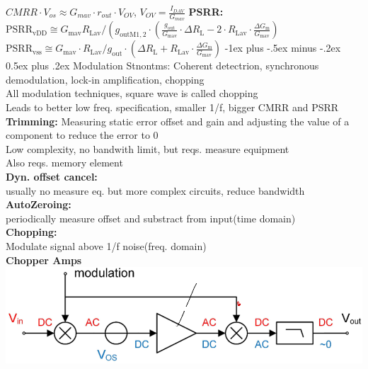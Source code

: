 \documentclass[5pt,landscape]{article}
\makeatletter
\renewcommand{\section}{\@startsection{section}{1}{0mm}%
                                {-1ex plus -.5ex minus -.2ex}%
                                {0.5ex plus .2ex}%
                                {\normalfont\large\bfseries}}
\makeatother
\begin{document}
\begin{multicols*}{5}
$ CMRR \cdot V_{os} \approx G_{mav} \cdot r_{out} \cdot V_{OV} $, $ V_{OV} = \frac{I_{DAV}}{G_{mav}} $
\textbf{PSRR:}\\
$ \mathrm{PSRR}_{\mathrm{vDD}} \cong G_{\operatorname{mav}} R_{\mathrm{Lav}} /\left(g_{\mathrm{outM} 1,2} \cdot\left(\frac{g_{\mathrm{out}}}{G_{\mathrm{mav}}} \cdot \Delta R_{\mathrm{L}}-2 \cdot R_{\mathrm{Lav}} \cdot \frac{\Delta G_{\mathrm{m}}}{G_{\mathrm{mav}}}\right)\right. $\\
$ \mathrm{PSRR}_{\mathrm{vss}} \cong G_{\operatorname{mav}} \cdot R_{\mathrm{Lav}} / g_{\mathrm{out}} \cdot\left(\Delta R_{\mathrm{L}}+R_{\mathrm{Lav}} \cdot \frac{\Delta G_{\mathrm{m}}}{G_{\mathrm{mav}}}\right) $
\section{Modulation}
Stnontms: Coherent detectrion, synchronous demodulation, lock-in amplification, chopping\\
All modulation techniques, square wave is called chopping\\
Leads to better low freq. specification, smaller 1/f, bigger CMRR and PSRR\\
\textbf{Trimming:} Measuring static error offset and gain and adjusting the value of a component to reduce the error to 0\\
Low complexity, no bandwith limit, but reqs. measure equipment\\
Also reqs. memory element\\
\textbf{Dyn. offset cancel:}\\
usually no measure eq. but more complex circuits, reduce bandwidth\\
\textbf{AutoZeroing:}\\
periodically measure offset and substract from input(time domain)\\
\textbf{Chopping:}\\
Modulate signal above 1/f noise(freq. domain)\\
\textbf{Chopper Amps}\\
\includegraphics[width=\columnwidth]{images/chop_amp.png}\\

\end{multicols*}
\end{document}

